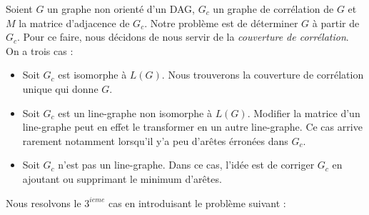 Soient $G$ un graphe non orient\'e d'un DAG,
 $G_c$ un graphe de corr\'elation de $G$ et 
 $M$ la matrice d'adjacence de $G_c$.
 \newline
 Notre probl\`eme est de d\'eterminer $G$ \`a partir de $G_c$. Pour ce faire, nous d\'ecidons de nous servir de la {\em couverture de corr\'elation}.
On a trois cas :
\begin{itemize}
	\item Soit $G_c$ est isomorphe \`a $L(G)$. Nous trouverons la couverture de corr\'elation unique qui donne $G$.%
	\item Soit $G_c$ est un line-graphe non isomorphe \`a $L(G)$. 
		Modifier la matrice d'un line-graphe peut en effet le transformer en un autre line-graphe. Ce cas arrive rarement notamment lorsqu'il y'a peu d'ar\^etes \'erron\'ees dans $G_c$. 
	\item Soit $G_c$ n'est pas un line-graphe. Dans ce cas, l'id\'ee est de corriger $G_c$ en ajoutant ou supprimant le minimum d'ar\^etes.
\end{itemize}
Nous resolvons le $3^{ieme}$ cas en introduisant le probl\`eme suivant :



